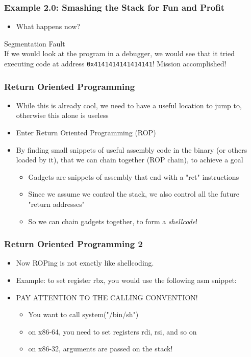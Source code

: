 \documentclass[aspectratio=169]{beamer}
\newcommand{\hex}[1]{\texttt{0x#1}}
\begin{document}
\begin{frame}[fragile]
    \frametitle{Example 2.0: Smashing the Stack for Fun and Profit}
    \begin{itemize}
        \item What happens now?
    \end{itemize}
    \pause
    \begin{alertblock}{Segmentation Fault}
        \\
        If we would look at the program in a debugger, we would see that it tried executing code at address \hex{4141414141414141}!
        Mission accomplished!
    \end{alertblock}

\end{frame}
\begin{frame}[fragile]
	\frametitle{Return Oriented Programming}
	\begin{itemize}
		\item While this is already cool, we need to have a useful location to jump to, otherwise this alone is useless
		\item Enter Return Oriented Programming (ROP)
		\item By finding small snippets of useful assembly code in the binary (or others loaded by it), that we can chain together (ROP chain), to achieve a goal
		\pause
		\vspace{2em}
		\begin{itemize}
			\item Gadgets are snippets of assembly that end with a "ret" instructions
			\item Since we assume we control the stack, we also control all the future "return addresses"
			\item So we can chain gadgets together, to form a \emph{shellcode}!
		\end{itemize}
	\end{itemize}
\end{frame}
\begin{frame}[fragile]
	\frametitle{Return Oriented Programming 2}
	\begin{itemize}
		\item Now ROPing is not exactly like shellcoding. 
		\item Example: to set register rbx, you would use the following asm snippet: 
		\\ 
		\pause
		\item PAY ATTENTION TO THE CALLING CONVENTION!
		\vspace{2em}
		\begin{itemize}
			\item You want to call system("/bin/sh")
			\item on x86-64, you need to set registers rdi, rsi, and so on
			\item on x86-32, arguments are passed on the stack!
		\end{itemize}
	\end{itemize}
\end{frame}
\end{document}
